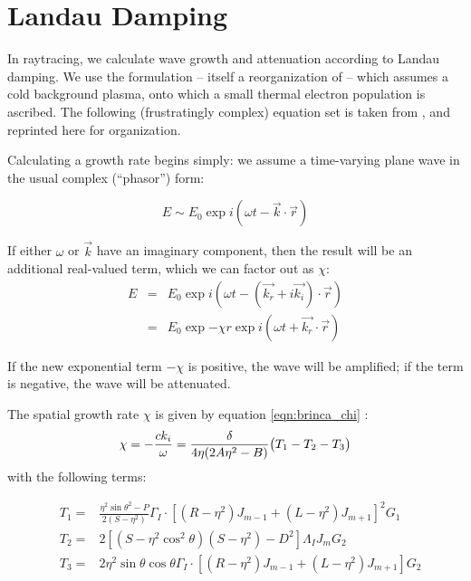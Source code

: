 \section{Landau Damping}
\label{appendix:landau}

In raytracing, we calculate wave growth and attenuation according to Landau damping. We use the \citet{Brinca1972} formulation -- itself a reorganization of \cite{Kennel1966} -- which assumes a cold background plasma, onto which a small thermal electron population is ascribed. The following (frustratingly complex) equation set is taken from \cite{Brinca1972}, and reprinted here for organization.

Calculating a growth rate begins simply: we assume a time-varying plane wave in the usual complex (``phasor'') form:

\begin{equation}
E \sim E_0 \exp{i(\omega t - \vec{k}\cdot\vec{r})}
\end{equation}

If either $\omega$ or $\vec{k}$ have an imaginary component, then the result will be an additional real-valued term, which we can factor out as $\chi$:
\begin{eqnarray}
E & = &E_0 \exp{i( \omega t - (\vec{k_r} + i\vec{k_i})\cdot\vec{r})} \\
& = &E_0 \exp{-\chi r}\exp{i(\omega t + \vec{k_r}\cdot\vec{r})}
\end{eqnarray}

If the new exponential term $-\chi$ is positive, the wave will be amplified; if the term is negative, the wave will be attenuated.

The spatial growth rate $\chi$ is given by equation \eqref{eqn:brinca_chi} \citep{Brinca1972,Kennel1966}:
\begin{equation}
\chi = -\frac{c k_i}{\omega} = \frac{\delta}{4 \eta (2 A \eta^2 - B)} \big( T_1 - T_2 - T_3 \big) \\ \label{eqn:brinca_chi} 
\end{equation}
with the following terms:

\begin{eqnarray}
&T_1 = & \frac{\eta^2\sin{\theta}^2 - P}{2(S - \eta^2)}\Gamma_I \cdot [(R - \eta^2)J_{m-1} + (L - \eta^2)J_{m+1}]^2 G_1 \\ \nonumber
&T_2 = & 2[(S - \eta^2 \cos^2\theta)(S - \eta^2) - D^2] \Lambda_I J_m G_2 \\ \nonumber
&T_3 = & 2\eta^2 \sin \theta \cos \theta \Gamma_I\cdot [(R - \eta^2)J_{m-1} + (L - \eta^2)J_{m+1}]G_2 \\ \nonumber
\end{eqnarray}


